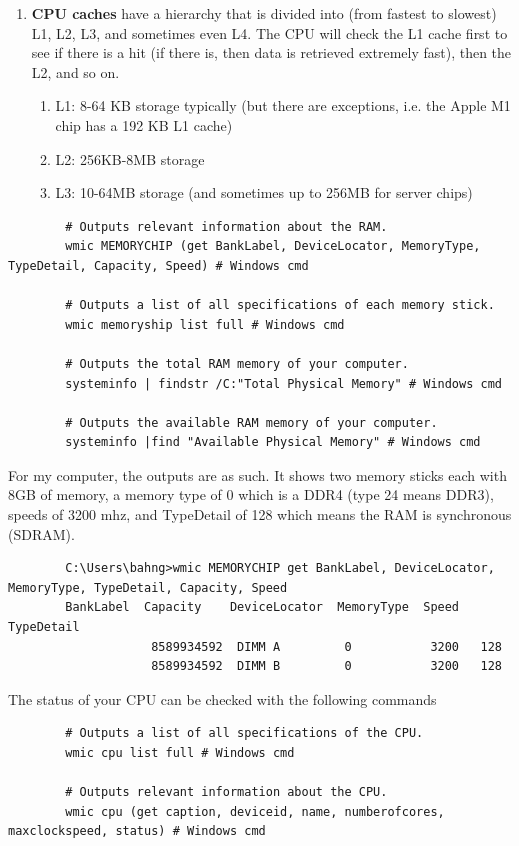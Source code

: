 \documentclass{article}
\begin{document}
\begin{enumerate}
        \item \textbf{CPU caches} have a hierarchy that is divided into (from fastest to slowest) L1, L2, L3, and sometimes even L4. The CPU will check the L1 cache first to see if there is a hit (if there is, then data is retrieved extremely fast), then the L2, and so on. 
        \begin{enumerate}
            \item L1: 8-64 KB storage typically (but there are exceptions, i.e. the Apple M1 chip has a 192 KB L1 cache)
            \item L2: 256KB-8MB storage
            \item L3: 10-64MB storage (and sometimes up to 256MB for server chips)
        \end{enumerate}
      \end{enumerate}

      \begin{lstlisting}
        # Outputs relevant information about the RAM. 
        wmic MEMORYCHIP (get BankLabel, DeviceLocator, MemoryType, TypeDetail, Capacity, Speed) # Windows cmd 

        # Outputs a list of all specifications of each memory stick.
        wmic memoryship list full # Windows cmd

        # Outputs the total RAM memory of your computer.
        systeminfo | findstr /C:"Total Physical Memory" # Windows cmd

        # Outputs the available RAM memory of your computer.
        systeminfo |find "Available Physical Memory" # Windows cmd
      \end{lstlisting}

      For my computer, the outputs are as such. It shows two memory sticks each with 8GB of memory, a memory type of 0 which is a DDR4 (type 24 means DDR3), speeds of 3200 mhz, and TypeDetail of 128 which means the RAM is synchronous (SDRAM).
      \begin{lstlisting}
        C:\Users\bahng>wmic MEMORYCHIP get BankLabel, DeviceLocator, MemoryType, TypeDetail, Capacity, Speed
        BankLabel  Capacity    DeviceLocator  MemoryType  Speed  TypeDetail
                    8589934592  DIMM A         0           3200   128
                    8589934592  DIMM B         0           3200   128
      \end{lstlisting}

      The status of your CPU can be checked with the following commands
      \begin{lstlisting}
        # Outputs a list of all specifications of the CPU.
        wmic cpu list full # Windows cmd

        # Outputs relevant information about the CPU.
        wmic cpu (get caption, deviceid, name, numberofcores, maxclockspeed, status) # Windows cmd
      \end{lstlisting}
\end{document}

